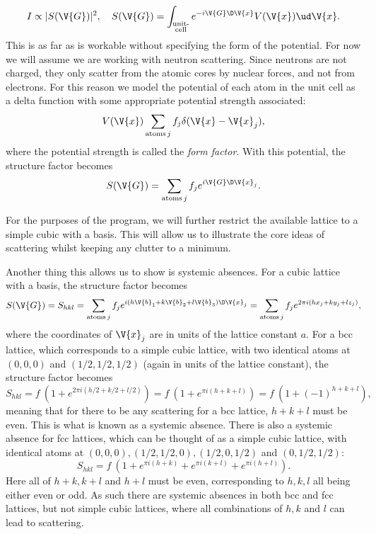 \documentclass[main.tex]{subfiles}
\begin{document}
	\begin{equation}
		I \propto |S(\V{G})|^2, \quad S(\V{G}) = \int_{\substack{\text{unit-} \\\text{cell}}} e^{-i \V{G} \D \V{x}} V(\V{x}) \ud \V{x}.
	\end{equation}
	This is as far as is workable without specifying the form of the potential. For now we will assume we are working with neutron scattering. Since neutrons are not charged, they only scatter from the atomic cores by nuclear forces, and not from electrons. For this reason we model the potential of each atom in the unit cell as a delta function with some appropriate potential strength associated:
	\begin{equation}\label{eq:Scat_neutron_pot}
		V(\V{x}) \sum_{\text{atoms} \,j} f_j \delta(\V{x}-\V{x}_j),
	\end{equation}
	where the potential strength is called the \textit{form factor}. With this potential, the structure factor becomes
	\begin{equation}\label{eq:Scat_struct}
		S(\V{G}) = \sum_{\text{atoms} \,j} f_j e^{i \V{G} \D \V{x}_j}.
	\end{equation}
	
	For the purposes of the program, we will further restrict the available lattice to a simple cubic with a basis. This will allow us to illustrate the core ideas of scattering whilst keeping any clutter to a minimum.
	
	Another thing this allows us to show is systemic absences. For a cubic lattice with a basis, the structure factor becomes
	\begin{equation}\label{eq:Scat_struct_ortho}
		S(\V{G}) = S_{hkl} = \sum_{\text{atoms}\, j} f_j e^{i (h\V{b}_1 + k\V{b}_2 + l\V{b}_3) \D \V{x}_j} = \sum_{\text{atoms}\, j} f_j e^{2\pi i (hx_j + ky_j + lz_j)},
	\end{equation}
	where the coordinates of $ \V{x}_j $ are in units of the lattice constant $ a $. For a bcc lattice, which corresponds to a simple cubic lattice, with two identical atoms at $ (0,0,0) $ and $ (1/2, 1/2, 1/2) $ (again in units of the lattice constant), the structure factor becomes
	\begin{equation}
		S_{hkl} = f\ (1 + e^{2\pi i (h/2 + k/2 + l/2)}) = f\ (1 + e^{\pi i (h+k+l)}) = f \ (1+ (-1)^{h+k+l}),
	\end{equation}
	meaning that for there to be any scattering for a bcc lattice, $ h+k+l $ must be even. This is what is known as a systemic absence. There is also a systemic absence for fcc lattices, which can be thought of as a simple cubic lattice, with identical atoms at $ (0,0,0), (1/2, 1/2, 0), (1/2, 0, 1/2) $ and $ (0, 1/2, 1/2) $:
	\begin{equation}
		S_{hkl} = f\ (1 + e^{\pi i (h+k)} + e^{\pi i (k+l)} + e^{\pi i (h+l)}).
	\end{equation}
	Here all of $ h+k, k+l $ and $ h+l $ must be even, corresponding to $ h,k,l $ all being either even or odd. As such there are systemic absences in both bcc and fcc lattices, but not simple cubic lattices, where all combinations of $ h,k $ and $ l $ can lead to scattering.
	
\end{document}
